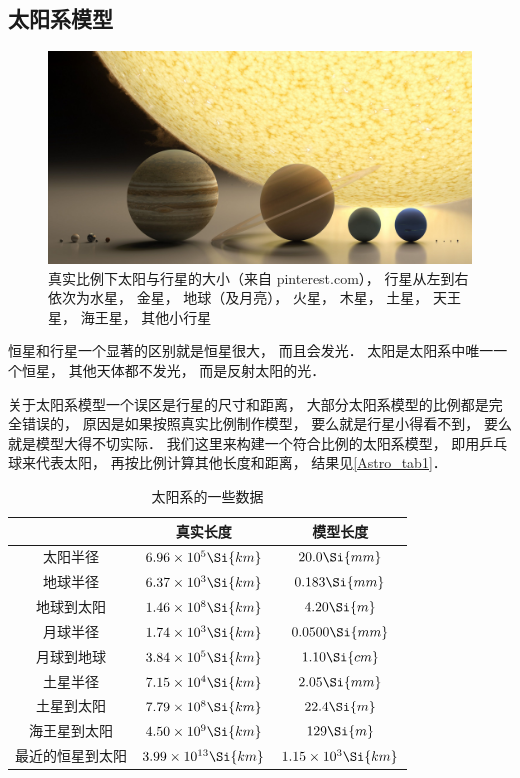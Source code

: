 
\subsection{太阳系模型}

\begin{figure}[ht]
\centering
\includegraphics[width=14cm]{./figures/Astro1.pdf}
\caption{真实比例下太阳与行星的大小（来自 pinterest.com）， 行星从左到右依次为水星， 金星， 地球（及月亮）， 火星， 木星， 土星， 天王星， 海王星， 其他小行星} \label{Astro_fig1}
\end{figure}

恒星和行星一个显著的区别就是恒星很大， 而且会发光． 太阳是太阳系中唯一一个恒星， 其他天体都不发光， 而是反射太阳的光．

关于太阳系模型一个误区是行星的尺寸和距离， 大部分太阳系模型的比例都是完全错误的， 原因是如果按照真实比例制作模型， 要么就是行星小得看不到， 要么就是模型大得不切实际． 我们这里来构建一个符合比例的太阳系模型， 即用乒乓球来代表太阳， 再按比例计算其他长度和距离， 结果见\autoref{Astro_tab1}．

\begin{table}[ht]
\centering
\caption{太阳系的一些数据}\label{Astro_tab1}
\begin{tabular}{|c|c|c|}
\hline
 & 真实长度 & 模型长度 \\
\hline
太阳半径 & $6.96\times 10^5 \Si{km}$ & $20.0 \Si{mm}$\\
\hline
地球半径 &  $6.37\times 10^3 \Si{km}$ & $0.183 \Si{mm}$\\
\hline
地球到太阳  &  $1.46 \times 10^8 \Si{km}$ & $4.20 \Si{m}$\\
\hline
月球半径 & $1.74 \times 10^3 \Si{km}$ & $0.0500 \Si{mm}$\\
\hline
月球到地球 & $3.84 \times 10^5 \Si{km}$ &  $1.10 \Si{cm}$\\
\hline
土星半径 & $7.15 \times 10^4 \Si{km}$ & $2.05 \Si{mm}$\\
\hline
土星到太阳 & $7.79 \times 10^8 \Si{km}$ & $22.4 \Si{m}$\\
\hline
海王星到太阳 & $4.50 \times 10^9 \Si{km}$ & $129 \Si{m}$\\
\hline
最近的恒星到太阳 & $3.99 \times 10^{13} \Si{km}$ &  $1.15 \times 10^3 \Si{km}$\\
\hline
\end{tabular}
\end{table}

